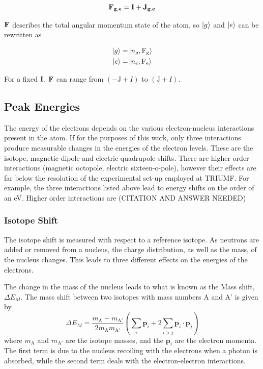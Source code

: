 \documentclass[12pt,a4paper,margin=1in]{book}
\begin{document}
\begin{equation}
\bf{F_{g,e}} = \bf{I} + \bf{J_{g,e}}
\end{equation}

$\bf{F}$ describes the total angular momentum state of the atom, so $\ket{g}$ and $\ket{e}$ can be rewritten as

\begin{align}
\ket{g} =& \ket{n_g,\mathrm{F_g}}\\
\ket{e} =& \ket{n_e,\mathrm{F_e}}
\end{align}

For a fixed $\bf{I}$, $\bf{F}$ can range from $(-\mathrm{J}+I)$ to $(\mathrm{J}+I)$.
\subsection{Peak Energies}
The energy of the electrons depends on the various electron-nucleus interactions present in the atom. If for the purposes of this work, only three interactions produce measurable changes in the energies of the electron levels. These are the isotope, magnetic dipole and electric quadrupole shifts. There are higher order interactions (magnetic octopole, electric sixteen-o-pole), however their effects are far below the resolution of the experimental set-up employed at TRIUMF. For example, the three interactions listed above lead to energy shifts on the order of an eV. Higher order interactions are (CITATION AND ANSWER NEEDED) 

\subsubsection*{Isotope Shift}
The isotope shift is measured with respect to a reference isotope. As neutrons are added or removed from a nucleus, the charge distribution, as well as the mass, of the nucleus changes. This leads to three different effects on the energies of the electrons. 

The change in the mass of the nucleus leads to what is known as the Mass shift, $\Delta E_M$. The mass shift between two isotopes with mass numbers A and A' is given by
\begin{equation}
\Delta E_M = \frac{m_{\mathrm{A}}-m_{\mathrm{A'}}}{2 m_{\mathrm{A}} m_{\mathrm{A'}}} \left(\sum_i\mathrm{\textbf{p}}_i +2 \sum_{i>j}\mathrm{\textbf{p}}_i \cdot \mathrm{\textbf{p}}_j \right)
\end{equation}
where $m_{\mathrm{A}}$ and $m_{\mathrm{A'}}$ are the isotope masses, and the $\textbf{p}_i$ are the electron momenta. The first term is due to the nucleus recoiling with the electrons when a photon is absorbed, while the second term deals with the electron-electron interactions.  
\end{document}
